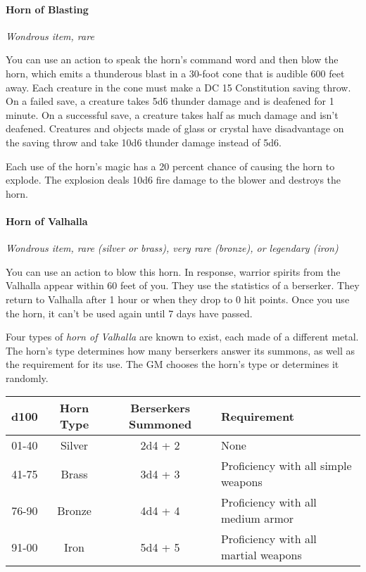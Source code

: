 \documentclass[
]{article}
\begin{document}
\hypertarget{horn-of-blasting}{%
\paragraph{Horn of Blasting}\label{horn-of-blasting}}

\emph{Wondrous item, rare}

You can use an action to speak the horn's command word and then blow the
horn, which emits a thunderous blast in a 30-foot cone that is audible
600 feet away. Each creature in the cone must make a DC 15 Constitution
saving throw. On a failed save, a creature takes 5d6 thunder damage and
is deafened for 1 minute. On a successful save, a creature takes half as
much damage and isn't deafened. Creatures and objects made of glass or
crystal have disadvantage on the saving throw and take 10d6 thunder
damage instead of 5d6.

Each use of the horn's magic has a 20 percent chance of causing the horn
to explode. The explosion deals 10d6 fire damage to the blower and
destroys the horn.

\hypertarget{horn-of-valhalla}{%
\paragraph{Horn of Valhalla}\label{horn-of-valhalla}}

\emph{Wondrous item, rare (silver or brass), very rare (bronze), or
legendary (iron)}

You can use an action to blow this horn. In response, warrior spirits
from the Valhalla appear within 60 feet of you. They use the statistics
of a berserker. They return to Valhalla after 1 hour or when they drop
to 0 hit points. Once you use the horn, it can't be used again until 7
days have passed.

Four types of \emph{horn of Valhalla} are known to exist, each made of a
different metal. The horn's type determines how many berserkers answer
its summons, as well as the requirement for its use. The GM chooses the
horn's type or determines it randomly.

\begin{longtable}[]{@{}cccl@{}}
\toprule
d100 & Horn Type & Berserkers Summoned & Requirement\tabularnewline
\midrule
\endhead
01-40 & Silver & 2d4 + 2 & None\tabularnewline
41-75 & Brass & 3d4 + 3 & Proficiency with all simple
weapons\tabularnewline
76-90 & Bronze & 4d4 + 4 & Proficiency with all medium
armor\tabularnewline
91-00 & Iron & 5d4 + 5 & Proficiency with all martial
weapons\tabularnewline
\bottomrule
\end{longtable}
\end{document}
